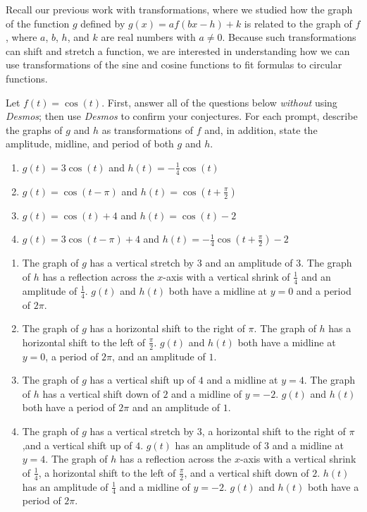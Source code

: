 \documentclass{ximera}
\begin{document}
Recall our previous work with transformations, where we studied how the graph of the function \(g\) defined by \(g(x) = af(bx - h) + k\) is related to the graph of \(f\), where \(a\), \(b\), $h$, and \(k\) are real numbers with \(a \ne 0\).  Because such transformations can shift and stretch a function, we are interested in understanding how we can use transformations of the sine and cosine functions to fit formulas to circular functions.%
\begin{example}
Let \(f(t) = \cos(t)\).  First, answer all of the questions below \emph{without} using \emph{Desmos}; then use \emph{Desmos} to confirm your conjectures.  For each prompt, describe the graphs of \(g\) and \(h\) as transformations of \(f\) and, in addition, state the amplitude, midline, and period of both \(g\) and \(h\).%
\begin{enumerate}[label=\alph*.]
\item \(g(t) = 3\cos(t)\) and \(h(t) = -\frac{1}{4}\cos(t)\)%
\item \(g(t) = \cos(t-\pi)\) and \(h(t) = \cos\left(t+ \frac{\pi}{2}\right)\)%
\item \(g(t) = \cos(t)+4\) and \(h(t) = \cos\left(t\right)-2\)%
\item \(g(t) = 3\cos(t-\pi)+4\) and \(h(t) = -\frac{1}{4}\cos\left(t+ \frac{\pi}{2}\right)-2\)%
\end{enumerate}
\begin{explanation}
\begin{enumerate}[label=\alph*.]
\item The graph of $g$ has a vertical stretch by 3 and an amplitude of 3. The graph of $h$ has a reflection across the $x$-axis with a vertical shrink of $\frac{1}{4}$ and an amplitude of $\frac{1}{4}$. $g(t)$ and $h(t)$ both have a midline at $y=0$ and a period of $2\pi$.
\item The graph of $g$ has a horizontal shift to the right of $\pi$. The graph of $h$ has a horizontal shift to the left of $\frac{\pi}{2}$. $g(t)$ and $h(t)$ both have a midline at $y=0$, a period of $2\pi$, and an amplitude of $1$.
\item The graph of $g$ has a vertical shift up of $4$ and a midline at $y=4$. The graph of $h$ has a vertical shift down of $2$ and a midline of $y=-2$. $g(t)$ and $h(t)$ both have a period of $2\pi$ and an amplitude of $1$.
\item The graph of $g$ has a vertical stretch by 3,  a horizontal shift to the right of $\pi$,and a vertical shift up of $4$. $g(t)$ has an amplitude of 3 and a midline at $y=4$. The graph of $h$ has a reflection across the $x$-axis with a vertical shrink of $\frac{1}{4}$, a horizontal shift to the left of $\frac{\pi}{2}$, and a vertical shift down of $2$. $h(t)$ has an amplitude of $\frac{1}{4}$ and a midline of $y=-2$. $g(t)$ and $h(t)$ both have a period of $2\pi$.
\end{enumerate}
\end{explanation}
%
\end{example}
\end{document}
